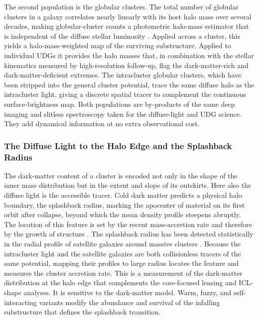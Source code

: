 The second population is the globular clusters. The total number of globular clusters in a galaxy correlates nearly linearly with its host halo mass over several decades, making globular-cluster counts a photometric halo-mass estimator that is independent of the diffuse stellar luminosity \cite{harris2013}. Applied across a cluster, this yields a halo-mass-weighted map of the surviving substructure. Applied to individual UDGs it provides the halo masses that, in combination with the stellar kinematics measured by high-resolution follow-up, flag the dark-matter-rich and dark-matter-deficient extremes. The intracluster globular clusters, which have been stripped into the general cluster potential, trace the same diffuse halo as the intracluster light, giving a discrete spatial tracer to complement the continuous surface-brightness map. Both populations are by-products of the same deep imaging and slitless spectroscopy taken for the diffuse-light and UDG science. They add dynamical information at no extra observational cost.

\subsubsection{The Diffuse Light to the Halo Edge and the Splashback Radius}

The dark-matter content of a cluster is encoded not only in the shape of the inner mass distribution but in the extent and slope of its outskirts. Here also the diffuse light is the accessible tracer. Cold dark matter predicts a physical halo boundary, the splashback radius, marking the apocenter of material on its first orbit after collapse, beyond which the mean density profile steepens abruptly. The location of this feature is set by the recent mass-accretion rate and therefore by the growth of structure \cite{more2015}. The splashback radius has been detected statistically in the radial profile of satellite galaxies around massive clusters \cite{more2016}. Because the intracluster light and the satellite galaxies are both collisionless tracers of the same potential, mapping their profiles to large radius locates the feature and measures the cluster accretion rate. This is a measurement of the dark-matter distribution at the halo edge that complements the core-focused lensing and ICL-shape analyses. It is sensitive to the dark-matter model. Warm, fuzzy, and self-interacting variants modify the abundance and survival of the infalling substructure that defines the splashback transition.

